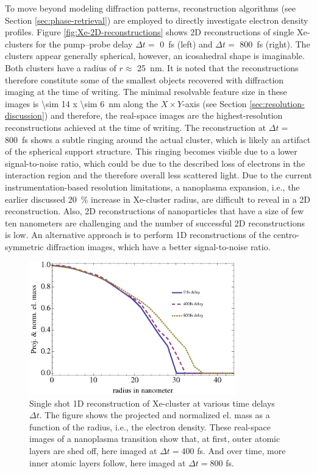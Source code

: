 To move beyond modeling diffraction patterns, reconstruction algorithms (see Section \ref{sec:phase-retrieval}) are employed to directly investigate electron density profiles. Figure \ref{fig:Xe-2D-reconstructions} shows 2D reconstructions of single Xe-clusters for the pump--probe delay $\Delta t =$ \SI{0}{\femto\second} (left) and $\Delta t=$ \SI{800}{\femto\second} (right). The clusters appear generally spherical, however, an icosahedral shape is imaginable. Both clusters have a radius of $r\approx$ \SI{25}{\nano\meter}. It is noted that the reconstructions therefore constitute some of the smallest objects recovered with diffraction imaging at the time of writing. The minimal resolvable feature size in these images is \SI{\sim 14 x \sim 6}{\nano\meter} along the $X \times Y$-axis (see Section \ref{sec:resolution-discussion}) and therefore, the real-space images are the highest-resolution reconstructions achieved at the time of writing. The reconstruction at $\Delta t=$ \SI{800}{\femto\second} shows a subtle ringing around the actual cluster, which is likely an artifact of the spherical support structure. This ringing becomes visible due to a lower signal-to-noise ratio, which could be due to the described loss of electrons in the interaction region and the therefore overall less scattered light. Due to the current instrumentation-based resolution limitations, a nanoplasma expansion, i.e., the earlier discussed \SI{20}{\percent} increase in Xe-cluster radius, are difficult to reveal in a 2D reconstruction. Also, 2D reconstructions of nanoparticles that have a size of few ten nanometers are challenging and the number of successful 2D reconstructions is low. An alternative approach is to perform 1D reconstructions of the centro-symmetric diffraction images, which have a better signal-to-noise ratio.\\[1\baselineskip]
\begin{figure}
	\centering
		\includegraphics[width=0.80\textwidth]{images/results/Xe-reconstructions.eps}
	\caption[Single-shot 1D reconstruction of \SI{\sim 30}{\nano\meter} radius Xe-cluster]{Single shot 1D reconstruction of Xe-cluster at various time delays $\Delta t$. The figure shows the projected and normalized el. mass as a function of the radius, i.e., the electron density. These real-space images of a nanoplasma transition show that, at first, outer atomic layers are shed off, here imaged at $\Delta t=400$ fs. And over time, more inner atomic layers follow, here imaged at $\Delta t= 800$ fs.}
	\label{fig:Xe-reconstructions}
\end{figure}
